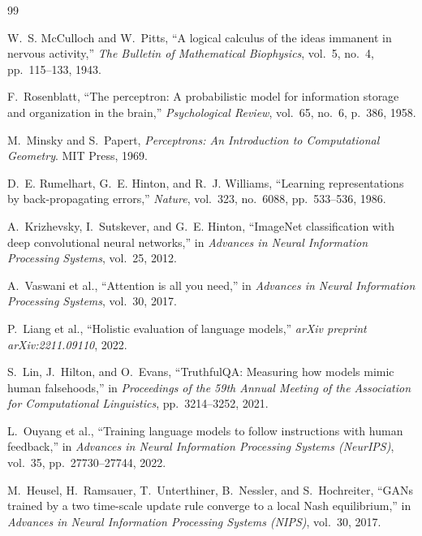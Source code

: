 \documentclass{book}
\begin{document}
\begin{thebibliography}{99}
 
 
W.~S. McCulloch and W.~Pitts, ``A logical calculus of the ideas immanent in nervous activity,'' \textit{The Bulletin of Mathematical Biophysics}, vol.~5, no.~4, pp.~115--133, 1943.
 
F.~Rosenblatt, ``The perceptron: A probabilistic model for information storage and organization in the brain,'' \textit{Psychological Review}, vol.~65, no.~6, p.~386, 1958.
 
M.~Minsky and S.~Papert, \textit{Perceptrons: An Introduction to Computational Geometry}. MIT Press, 1969.
 
D.~E. Rumelhart, G.~E. Hinton, and R.~J. Williams, ``Learning representations by back-propagating errors,'' \textit{Nature}, vol.~323, no.~6088, pp.~533--536, 1986.
 
A.~Krizhevsky, I.~Sutskever, and G.~E. Hinton, ``ImageNet classification with deep convolutional neural networks,'' in \textit{Advances in Neural Information Processing Systems}, vol.~25, 2012.
 
A.~Vaswani et al., ``Attention is all you need,'' in \textit{Advances in Neural Information Processing Systems}, vol.~30, 2017.
 
P.~Liang et al., ``Holistic evaluation of language models,'' \textit{arXiv preprint arXiv:2211.09110}, 2022.
 
S.~Lin, J.~Hilton, and O.~Evans, ``TruthfulQA: Measuring how models mimic human falsehoods,'' in \textit{Proceedings of the 59th Annual Meeting of the Association for Computational Linguistics}, pp.~3214--3252, 2021.
 
L.~Ouyang et al., ``Training language models to follow instructions with human feedback,'' in \textit{Advances in Neural Information Processing Systems (NeurIPS)}, vol.~35, pp.~27730--27744, 2022.
 
M.~Heusel, H.~Ramsauer, T.~Unterthiner, B.~Nessler, and S.~Hochreiter, ``GANs trained by a two time-scale update rule converge to a local Nash equilibrium,'' in \textit{Advances in Neural Information Processing Systems (NIPS)}, vol.~30, 2017.
 

\end{thebibliography}
\end{document}
